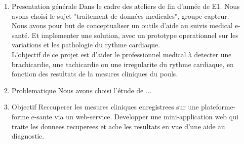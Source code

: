 \begin{enumerate}

	\item{Presentation générale}
Dans le cadre des ateliers de fin d'année de E1. Nous avons choisi le sujet "traitement de données medicales", groupe capteur. \\
Nous avons pour but de conceptualiser un outils d'aide au suivis medical e-santé. Et implementer une solution, avec un prototype operationnel sur les variations et les pathologie du rythme cardiaque.\\
L'objectif de ce projet est d'aider le professionnel medical à detecter une brachicardie, une tachicardie ou une irregularite du rythme cardiaque, en fonction des resultats de la mesures cliniques du pouls. 

	\item{Problematique}
Nous avons choisi l'étude de ...

	\item{Objectif}
Reccuperer les mesures cliniques enregistrees sur une plateforme-forme e-sante via un web-service. Developper une mini-application web qui traite les donnees recuperees et ache les resultats en vue d'une aide au diagnostic.

\end{enumerate}
